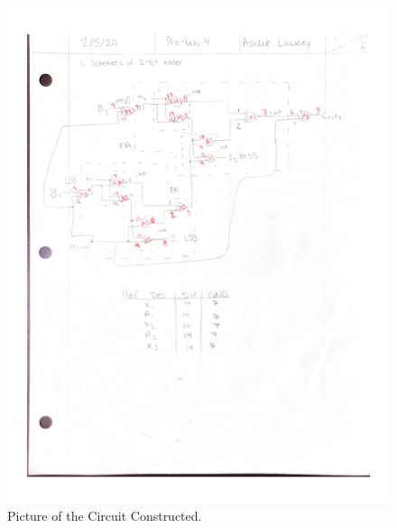 \documentclass[11pt]{article}
\begin{document}
\begin{figure}
	\includegraphics[width=1.0\textwidth]{"Schematic"}
	\caption{Picture of the Circuit Constructed.}
\end{figure}
\clearpage
\end{document}
